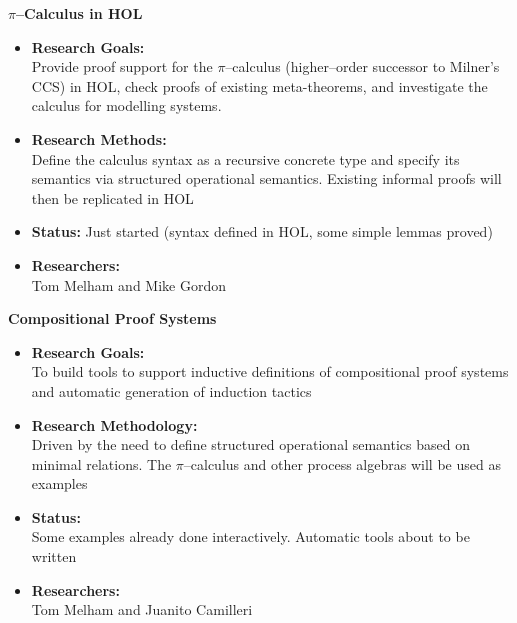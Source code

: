 \begin{center}{\bf $\pi$--Calculus in {\small HOL}}\end{center}
\begin{itemize}
\item {\bf Research Goals:} $\;$ \\
Provide proof support for the $\pi$--calculus (higher--order successor
to Milner's {\small CCS}) in {\small HOL}, check proofs of existing
meta-theorems, and investigate the calculus for modelling systems.
\item {\bf Research Methods:} $\;$ \\
Define the calculus syntax as a recursive concrete type and specify its
semantics via structured operational semantics.  Existing informal proofs
will then be replicated in {\small HOL}
\item {\bf Status:} Just started (syntax defined in {\small HOL}, some simple lemmas proved)
\item {\bf Researchers:} $\;$ \\
Tom Melham and Mike Gordon
\end{itemize}

\begin{center}{\bf Compositional Proof Systems}\end{center}
\begin{itemize}
\item {\bf Research Goals:} $\;$ \\
To build tools to support inductive definitions of compositional proof systems
and automatic generation of induction tactics
\item {\bf Research Methodology:} $\;$ \\
Driven by the need to define structured operational semantics based on minimal
relations. The $\pi$--calculus and other process algebras will be used as 
examples
\item {\bf Status:}$\;$ \\
Some examples already done interactively.  Automatic tools about to be written
\item {\bf Researchers:} $\;$ \\
Tom Melham and Juanito Camilleri
\end{itemize}

